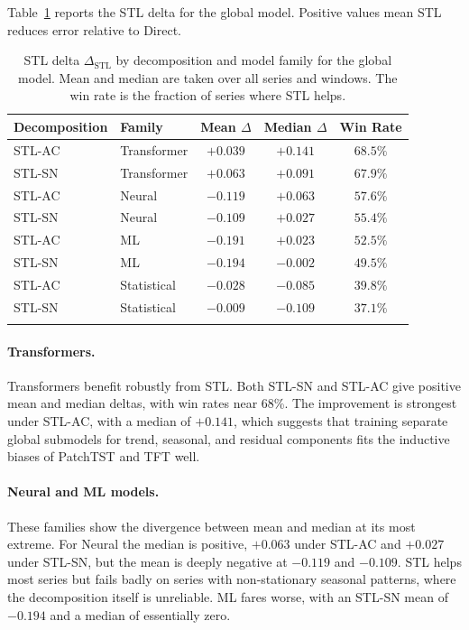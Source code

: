 \documentclass[pdflatex,sn-mathphys-num]{sn-jnl}
\theoremstyle{thmstyleone}
\theoremstyle{thmstyletwo}
\theoremstyle{thmstylethree}
\begin{document}
Table~\ref{tab:stl_delta} reports the STL delta for the global model. Positive
values mean STL reduces error relative to Direct.

\begin{table}[ht]
\caption{STL delta $\Delta_{\mathrm{STL}}$ by decomposition and model family
for the global model. Mean and median are taken over all series and windows.
The win rate is the fraction of series where STL helps.}\label{tab:stl_delta}
\begin{tabular*}{\textwidth}{@{\extracolsep\fill}llccc}
\toprule
Decomposition & Family & Mean $\Delta$ & Median $\Delta$ & Win Rate \\
\midrule
STL-AC & Transformer  & $+0.039$ & $+0.141$ & $68.5\%$ \\
STL-SN & Transformer  & $+0.063$ & $+0.091$ & $67.9\%$ \\
STL-AC & Neural       & $-0.119$ & $+0.063$ & $57.6\%$ \\
STL-SN & Neural       & $-0.109$ & $+0.027$ & $55.4\%$ \\
STL-AC & ML           & $-0.191$ & $+0.023$ & $52.5\%$ \\
STL-SN & ML           & $-0.194$ & $-0.002$ & $49.5\%$ \\
STL-AC & Statistical  & $-0.028$ & $-0.085$ & $39.8\%$ \\
STL-SN & Statistical  & $-0.009$ & $-0.109$ & $37.1\%$ \\
\botrule
\end{tabular*}
\end{table}

\paragraph{Transformers.}
Transformers benefit robustly from STL. Both STL-SN and STL-AC give positive
mean and median deltas, with win rates near 68\%. The improvement is strongest
under STL-AC, with a median of $+0.141$, which suggests that training separate
global submodels for trend, seasonal, and residual components fits the
inductive biases of PatchTST and TFT well.

\paragraph{Neural and ML models.}
These families show the divergence between mean and median at its most
extreme. For Neural the median is positive, $+0.063$ under STL-AC and $+0.027$
under STL-SN, but the mean is deeply negative at $-0.119$ and $-0.109$. STL
helps most series but fails badly on series with non-stationary seasonal
patterns, where the decomposition itself is unreliable. ML fares worse, with
an STL-SN mean of $-0.194$ and a median of essentially zero.
\end{document}
